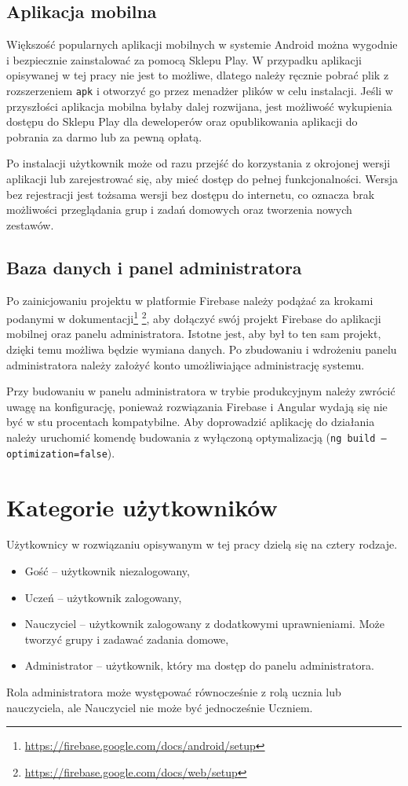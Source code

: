 \documentclass[a4paper,twoside,12pt]{book}
\begin{document}
\subsection{Aplikacja mobilna}
Większość popularnych aplikacji mobilnych w systemie Android można wygodnie i bezpiecznie zainstalować za pomocą Sklepu Play. W przypadku aplikacji opisywanej w tej pracy nie jest to możliwe, dlatego należy ręcznie pobrać plik z rozszerzeniem \texttt{apk} i otworzyć go przez menadżer plików w celu instalacji. Jeśli w przyszłości aplikacja mobilna byłaby dalej rozwijana, jest możliwość wykupienia dostępu do Sklepu Play dla deweloperów oraz opublikowania aplikacji do pobrania za darmo lub za pewną opłatą. 

Po instalacji użytkownik może od razu przejść do korzystania z okrojonej wersji aplikacji lub zarejestrować się, aby mieć dostęp do pełnej funkcjonalności. Wersja bez rejestracji jest tożsama wersji bez dostępu do internetu, co oznacza brak możliwości przeglądania grup i zadań domowych oraz tworzenia nowych zestawów.

\subsection{Baza danych i panel administratora}

Po zainicjowaniu projektu w platformie Firebase należy podążać za krokami podanymi w dokumentacji\footnote{\url{https://firebase.google.com/docs/android/setup}} \footnote{\url{https://firebase.google.com/docs/web/setup}}, aby dołączyć swój projekt Firebase do aplikacji mobilnej oraz panelu administratora. Istotne jest, aby był to ten sam projekt, dzięki temu możliwa będzie wymiana danych. Po zbudowaniu i wdrożeniu panelu administratora należy założyć konto umożliwiające administrację systemu. 

Przy budowaniu w panelu administratora w trybie produkcyjnym należy zwrócić uwagę na konfigurację, ponieważ rozwiązania Firebase i Angular wydają się nie być w stu procentach kompatybilne. Aby doprowadzić aplikację do działania należy uruchomić komendę budowania z wyłączoną optymalizacją (\texttt{ng build --optimization=false}).

\section{Kategorie użytkowników}

Użytkownicy w rozwiązaniu opisywanym w tej pracy dzielą się na cztery rodzaje. 
\begin{itemize}
\item Gość -- użytkownik niezalogowany,
\item Uczeń -- użytkownik zalogowany,
\item Nauczyciel -- użytkownik zalogowany z dodatkowymi uprawnieniami. Może tworzyć grupy i zadawać zadania domowe,
\item Administrator -- użytkownik, który ma dostęp do panelu administratora.
\end{itemize}
Rola administratora może występować równocześnie z rolą ucznia lub nauczyciela, ale Nauczyciel nie może być jednocześnie Uczniem.
\end{document}
